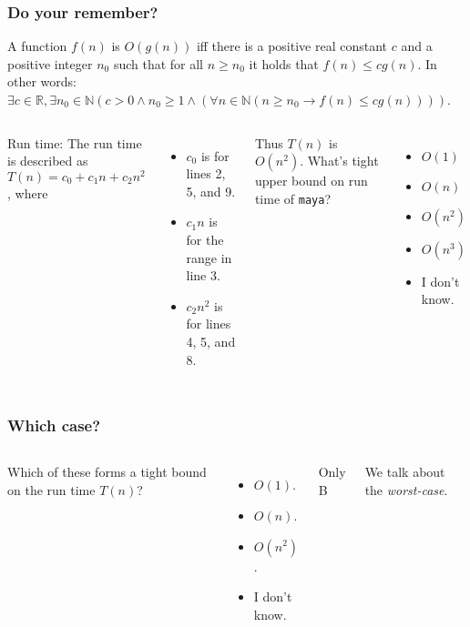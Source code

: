 \begin{frame}
	\frametitle{Do your remember?}
	
	\begin{definition}[Big-Oh]
		A function $f(n)$ is $O(g(n))$ iff there is a positive real constant $c$ and a positive integer $n_0$ such that for
		all $n \geq n_0$ it holds that $f(n) \leq c g(n)$. In other words:\\
		$\exists c \in \mathbb{R}, \exists n_0 \in \mathbb{N} (c > 0 \wedge n_0 \geq 1 \wedge (\forall n \in \mathbb{N} (n
		\geq n_0 \to f(n) \leq cg(n))))$.
	\end{definition}
	
	\begin{columns}
		
			
Run time:
				The run time is described as $T(n) = c_0 + c_1n + c_2n^2$, where
				\begin{itemize}
					\item $c_0$ is for lines 2, 5, and 9.
					\item $c_1n$ is for the range in line 3.
					\item $c_2n^2$ is for lines 4, 5, and 8.
				\end{itemize}
				Thus $T(n)$ is $O(n^2)$. What's tight upper bound on run time of \texttt{maya}?
				\begin{itemize}
					\item $O(1)$
					\item $O(n)$
					\item $O(n^2)$
					\item $O(n^3)$
					\item I don't know.
				\end{itemize}
		
	\end{columns}
\end{frame}

\begin{frame}
	\frametitle{Which case?}

	
	\begin{columns}
		\column{0.755\linewidth}
		Which of these forms a tight bound on the run time $T(n)$?
	\begin{itemize}
		\small
		\item $O(1)$. 
		\item $O(n)$. 
		\item $O(n^2)$. 
		\item I don't know.
	\end{itemize}	
		\column{0.255\linewidth}
			Only B
		
			We talk about the \textit{worst-case}.
	\end{columns}
	
	
	
\end{frame}

